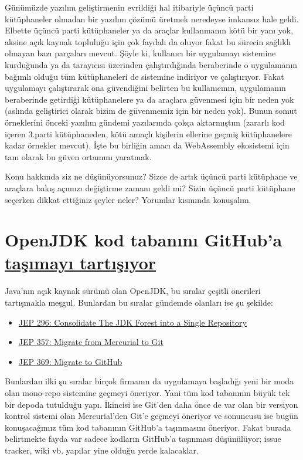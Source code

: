 \documentclass[11pt]{article}
\begin{document}
Günümüzde yazılım geliştirmenin evrildiği hal itibariyle üçüncü parti
kütüphaneler olmadan bir yazılım çözümü üretmek neredeyse imkansız hale geldi.
Elbette üçüncü parti kütüphaneler ya da araçlar kullanmanın kötü bir yanı yok,
aksine açık kaynak topluluğu için çok faydalı da oluyor fakat bu sürecin
sağlıklı olmayan bazı parçaları mevcut. Şöyle ki, kullanıcı bir uygulamayı
sistemine kurduğunda ya da tarayıcısı üzerinden çalıştırdığında beraberinde o
uygulamanın bağımlı olduğu tüm kütüphaneleri de sistemine indiriyor ve
çalıştırıyor. Fakat uygulamayı çalıştırarak ona güvendiğini belirten bu
kullanıcının, uygulamanın beraberinde getirdiği kütüphanelere ya da araçlara
güvenmesi için bir neden yok (aslında geliştirici olarak bizim de güvenmemiz
için bir neden yok). Bunun somut örneklerini önceki yazılım gündemi yazılarında
çokça aktarmıştım (zararlı kod içeren 3.parti kütüphaneden, kötü amaçlı
kişilerin ellerine geçmiş kütüphanelere kadar örnekler mevcut). İşte bu
birliğin amacı da WebAssembly ekosistemi için tam olarak bu güven ortamını
yaratmak.

Konu hakkında siz ne düşünüyorsunuz? Sizce de artık üçüncü parti kütüphane ve
araçlara bakış açımızı değiştirme zamanı geldi mi? Sizin üçüncü parti kütüphane
seçerken dikkat ettiğiniz şeyler neler? Yorumlar kısmında konuşalım.
\section{OpenJDK kod tabanını GitHub'a \href{https://www.infoworld.com/article/3453397/openjdk-repo-migration-to-github-gains-steam.html}{taşımayı tartışıyor}}
\label{sec:orgbbc601a}
Java'nın açık kaynak sürümü olan OpenJDK, bu sıralar çeşitli önerileri
tartışmakla meşgul. Bunlardan bu sıralar gündemde olanları ise şu şekilde:
\begin{itemize}
\item \href{https://openjdk.java.net/jeps/296}{JEP 296: Consolidate The JDK Forest into a Single Repository}
\item \href{https://openjdk.java.net/jeps/357}{JEP 357: Migrate from  Mercurial to Git}
\item \href{https://openjdk.java.net/jeps/369}{JEP 369: Migrate to GitHub}
\end{itemize}
Bunlardan ilki şu sıralar birçok firmanın da uygulamaya başladığı yeni bir moda
olan mono-repo sistemine geçmeyi öneriyor. Yani tüm kod tabanının büyük tek bir
depoda tutulduğu yapı. İkincisi ise Git'den daha önce de var olan bir versiyon
kontrol sistemi olan Mercurial'den Git'e geçmeyi öneriyor ve sonuncusu ise
bugün konuşacağımız tüm kod tabanının GitHub'a taşınmasını öneriyor. Fakat
burada belirtmekte fayda var sadece kodların GitHub'a taşınması düşünülüyor;
issue tracker, wiki vb. yapılar yine olduğu yerde kalacaklar.
\end{document}
